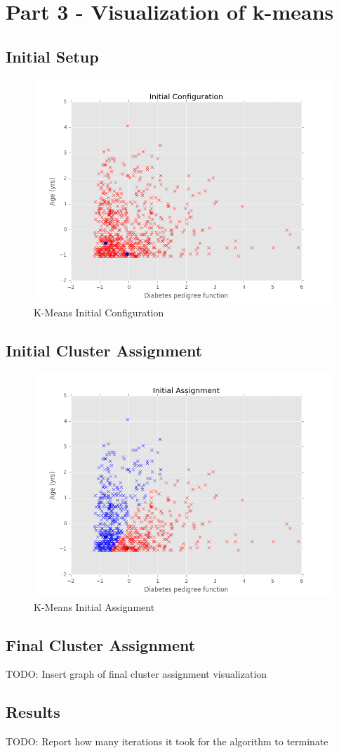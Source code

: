 \documentclass[12pt]{article}
\begin{document}
\newpage


\section*{Part 3 - Visualization of k-means}
\subsection*{Initial Setup}
\begin{figure}[H]
\begin{center}
\includegraphics[scale=0.85]{InitialConfiguration.png}
\caption{K-Means Initial Configuration}
\end{center}
\end{figure}
\subsection*{Initial Cluster Assignment}
\begin{figure}[H]
\begin{center}
\includegraphics[scale=0.85]{InitialAssignment.png}
\caption{K-Means Initial Assignment}
\end{center}
\end{figure}
\subsection*{Final Cluster Assignment}
TODO: Insert graph of final cluster assignment visualization
\subsection*{Results}
TODO: Report how many iterations it took for the algorithm to terminate
\end{document}
